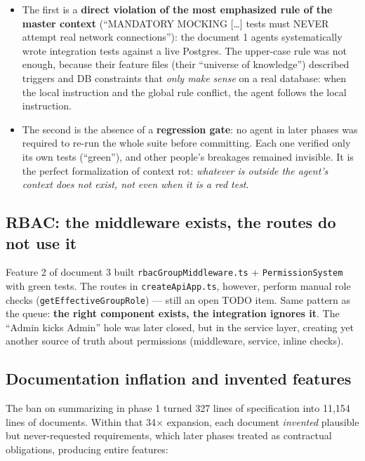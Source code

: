 \documentclass[11pt,a4paper]{article}
\newcommand{\file}[1]{\texttt{\small #1}}
\begin{document}
\begin{itemize}[leftmargin=1.5em]
  \item The first is a \textbf{direct violation of the most emphasized rule of the master context} (``MANDATORY MOCKING [\dots] tests must NEVER attempt real network connections''): the document 1 agents systematically wrote integration tests against a live Postgres. The upper-case rule was not enough, because their feature files (their ``universe of knowledge'') described triggers and DB constraints that \emph{only make sense} on a real database: when the local instruction and the global rule conflict, the agent follows the local instruction.
  \item The second is the absence of a \textbf{regression gate}: no agent in later phases was required to re-run the whole suite before committing. Each one verified only its own tests (``green''), and other people's breakages remained invisible. It is the perfect formalization of context rot: \emph{whatever is outside the agent's context does not exist, not even when it is a red test}.
\end{itemize}

\subsection{RBAC: the middleware exists, the routes do not use it}

Feature 2 of document 3 built \file{rbacGroupMiddleware.ts} + \file{PermissionSystem} with green tests. The routes in \file{createApiApp.ts}, however, perform manual role checks (\file{getEffectiveGroupRole}) --- still an open TODO item. Same pattern as the queue: \textbf{the right component exists, the integration ignores it}. The ``Admin kicks Admin'' hole was later closed, but in the service layer, creating yet another source of truth about permissions (middleware, service, inline checks).

\subsection{Documentation inflation and invented features}

The ban on summarizing in phase 1 turned 327 lines of specification into 11{,}154 lines of documents. Within that 34$\times$ expansion, each document \emph{invented} plausible but never-requested requirements, which later phases treated as contractual obligations, producing entire features:
\end{document}
